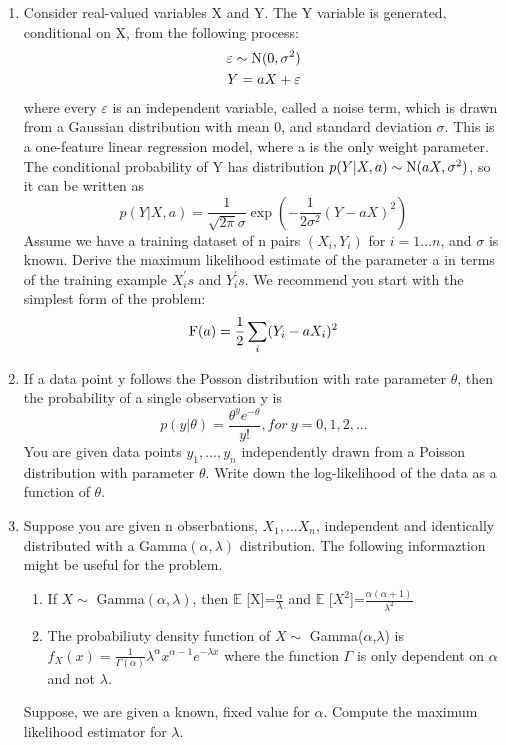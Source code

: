 \documentclass[a4paper]{article}
\begin{document}
\begin{enumerate}
		\item
		Consider real-valued variables X and Y. The Y variable is generated, conditional on X, from the following process:
		\begin{equation*}
		\begin{split}
			\varepsilon \sim {\rm N}(0,\sigma^2) \\
			Y = aX+\varepsilon
		\end{split}
		\end{equation*}
		where every $\varepsilon$ is an independent variable, called a noise term, which is drawn from a Gaussian distribution with mean 0, and standard deviation $\sigma$. This is a one-feature linear regression model, where a is the only weight parameter. The conditional probability of Y has distribution $p(Y|X,a)\sim{\rm N}(aX,\sigma^2)$, so it can be written as 
		\begin{equation*}
			p(Y|X,a)=\frac{1}{\sqrt{2\pi}\sigma}\exp(-\frac{1}{2\sigma^2}(Y-aX)^2)
		\end{equation*} 
		Assume we have a training dataset of n pairs $(X_i,Y_i)$ for $i=1...n$, and $\sigma$ is known. Derive the maximum likelihood estimate of the parameter a in terms of the training example $X_i^{'}s$ and $Y_i^{'}s$. We recommend you start with the simplest form of the problem:
		\begin{equation*}
			{\rm F}(a)=\frac{1}{2}\sum_{i}(Y_i - aX_i)^2
		\end{equation*} 
		\item
		If a data point y follows the Posson distribution with rate parameter $\theta$, then the probability of a single observation y is 
		\begin{equation*}
			p(y|\theta)=\frac{\theta^ye^{-\theta}}{y!}, for \  y = 0,1,2,...
		\end{equation*}
		You are given data points $y_1,...,y_n$ independently drawn from a Poisson distribution with parameter $\theta$. Write down the log-likelihood of the data as a function of $\theta$.
		\item
		Suppose you are given n obserbations, $X_1,...X_n$, independent and identically distributed with a Gamma$(\alpha,\lambda)$ distribution. The following informaztion might be useful for the problem.
		\begin{enumerate}
			\item
			If $X \sim $ Gamma$(\alpha,\lambda)$, then $\mathbb{E}$ [X]=$\frac{\alpha}{\lambda}	$ and $\mathbb{E}$ [$X^2$]=$\frac{\alpha(\alpha + 1)}{\lambda^2}$
			\item
			The probabiliuty density function of $X \sim$ Gamma($\alpha$,$\lambda$) is $f_X(x)=\frac{1}{\Gamma(\alpha)}\lambda^\alpha x^{\alpha - 1}e^{-\lambda x}$ where the function $\Gamma$ is only dependent on $\alpha$ and not $\lambda$.
		\end{enumerate}
		Suppose, we are given a known, fixed value for $\alpha$. Compute the maximum likelihood estimator for $\lambda$.
		
	\end{enumerate}
\end{document}
